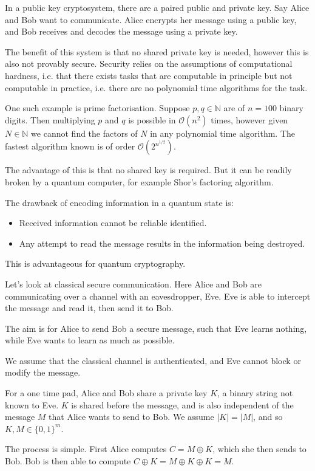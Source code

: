 \documentclass[12pt]{article}
\begin{document}
In a public key cryptosystem, there are a paired public and private key. Say Alice and Bob want to communicate. Alice encrypts her message using a public key, and Bob receives and decodes the message using a private key.

The benefit of this system is that no shared private key is needed, however this is also not provably secure. Security relies on the assumptions of computational hardness, i.e. that there exists tasks that are computable in principle but not computable in practice, i.e. there are no polynomial time algorithms for the task.

One such example is prime factorisation. Suppose $p, q \in \mathbb{N}$ are of $n = 100$ binary digits. Then multiplying $p$ and $q$ is possible in $\mathcal{O}(n^2)$ times, however given $N \in \mathbb{N}$ we cannot find the factors of $N$ in any polynomial time algorithm. The fastest algorithm known is of order $\mathcal{O}(2^{n^{1/2}})$.

The advantage of this is that no shared key is required. But it can be readily broken by a quantum computer, for example Shor's factoring algorithm.

The drawback of encoding information in a quantum state is:
\begin{itemize}
	\item Received information cannot be reliable identified.
	\item Any attempt to read the message results in the information being destroyed.
\end{itemize}
This is advantageous for quantum cryptography.

Let's look at classical secure communication. Here Alice and Bob are communicating over a channel with an eavesdropper, Eve. Eve is able to intercept the message and read it, then send it to Bob.

The aim is for Alice to send Bob a secure message, such that Eve learns nothing, while Eve wants to learn as much as possible.

We assume that the classical channel is authenticated, and Eve cannot block or modify the message.

For a one time pad, Alice and Bob share a private key $K$, a binary string not known to Eve. $K$ is shared before the message, and is also independent of the message $M$ that Alice wants to send to Bob. We assume $|K| = |M|$, and so $K, M \in \{0, 1\}^m$.

The process is simple. First Alice computes $C = M \oplus K$, which she then sends to Bob. Bob is then able to compute $C \oplus K = M \oplus K \oplus K = M$.
\end{document}
